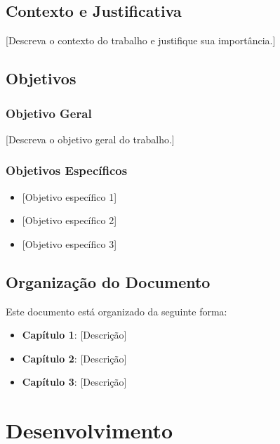 \documentclass[
12pt,
openright,
oneside,
a4paper,
chapter=TITLE,
section=TITLE,
french,
spanish,
brazil,
brazil
]{abntex2}
\providecommand{\tightlist}{
\setlength{\itemsep}{0ex}\setlength{\parskip}{0\baselineskip}}
\begin{document}
\section{Contexto e Justificativa}\label{contexto-e-justificativa}

{[}Descreva o contexto do trabalho e justifique sua importância.{]}

\section{Objetivos}\label{objetivos}

\subsection{Objetivo Geral}\label{objetivo-geral}

{[}Descreva o objetivo geral do trabalho.{]}

\subsection{Objetivos Específicos}\label{objetivos-especuxedficos}

\begin{itemize}
\tightlist
\item
  {[}Objetivo específico 1{]}
\item
  {[}Objetivo específico 2{]}
\item
  {[}Objetivo específico 3{]}
\end{itemize}

\section{Organização do Documento}\label{organizauxe7uxe3o-do-documento}

Este documento está organizado da seguinte forma:

\begin{itemize}
\tightlist
\item
  \textbf{Capítulo 1}: {[}Descrição{]}
\item
  \textbf{Capítulo 2}: {[}Descrição{]}
\item
  \textbf{Capítulo 3}: {[}Descrição{]}
\end{itemize}


\chapter{Desenvolvimento}\label{sec-development}
\end{document}
